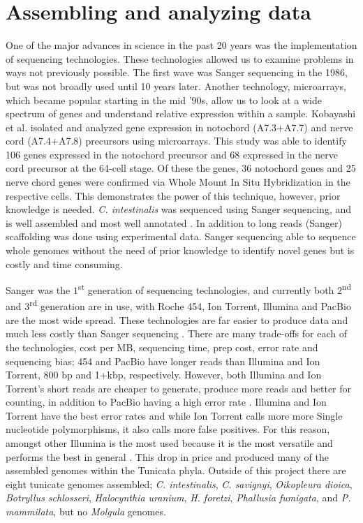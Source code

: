 \section{Assembling and analyzing data}
One of the major advances in science in the past 20 years was the implementation of sequencing technologies. These technologies allowed us to examine problems in ways not previously possible. The first wave was Sanger sequencing in the 1986, but was not broadly used until 10 years later. Another technology, microarrays, which became popular starting in the mid '90s, allow us to look at a wide spectrum of genes and understand relative expression within a sample. Kobayashi et al. \cite{kobayashi_differential_2013} isolated and analyzed gene expression in notochord (A7.3+A7.7) and nerve cord (A7.4+A7.8) precursors using microarrays. This study was able to identify 106 genes expressed in the notochord precursor and 68 expressed in the nerve cord precursor at the 64-cell stage. Of these the genes, 36 notochord genes and 25 nerve chord genes were confirmed via Whole Mount In Situ Hybridization in the respective cells. This demonstrates the power of this technique, however, prior knowledge is needed. \textit{C. intestinalis} was sequenced using Sanger sequencing, and is well assembled and most well annotated \cite{dehal_draft_2002}. In addition to long reads (Sanger) scaffolding was done using experimental data\cite{satou_improved_2008}. Sanger sequencing able to sequence whole genomes without the need of prior knowledge to identify novel genes but is costly and time consuming\cite{metzker_emerging_2005,liu_comparison_2012}. 

Sanger was the $1$\textsuperscript{st} generation of sequencing technologies, and currently both $2$\textsuperscript{nd} and $3$\textsuperscript{rd} generation are in use, with Roche 454, Ion Torrent, Illumina and PacBio are the most wide spread. These technologies are far easier to produce data and much less costly than Sanger sequencing \cite{metzker_emerging_2005}. There are many trade-offs for each of the technologies, cost per MB, sequencing time, prep cost, error rate and sequencing bias; 454 and PacBio have longer reads than Illumina and Ion Torrent, 800 bp and 1+kbp, respectively. However, both Illumina and Ion Torrent's short reads are cheaper to generate, produce more reads and better for counting, in addition to PacBio having a high error rate \cite{glenn_field_2011}. Illumina and Ion Torrent have the best error rates and while Ion Torrent calls more more Single nucleotide polymorphisms, it also calls more false positives.  For this reason, amongst other Illumina is the most used because it is the most versatile and performs the best in general \cite{quail_tale_2012}. This drop in price and produced many of the assembled genomes within the Tunicata phyla. Outside of this project there are eight tunicate genomes assembled; \textit{C. intestinalis}, \textit{C. savignyi}, \textit{Oikopleura dioica}, \textit{Botryllus schlosseri}, \textit{Halocynthia uranium}, \textit{H. foretzi}, \textit{Phallusia fumigata}, and \textit{P. mammilata}, but no \textit{Molgula} genomes. 

